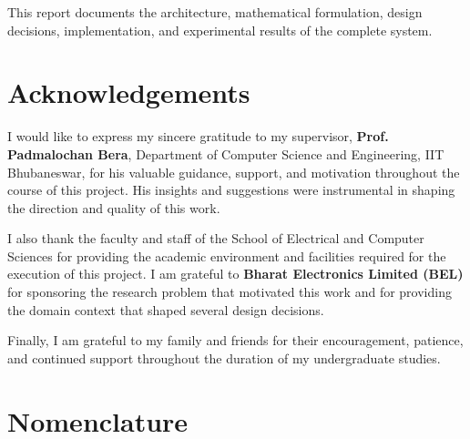 \documentclass[12pt, a4paper]{report}
\begin{document}
This report documents the architecture, mathematical formulation, design
decisions, implementation, and experimental results of the complete system.

\vfill

\chapter*{Acknowledgements}
\thispagestyle{plain}

I would like to express my sincere gratitude to my supervisor,
\textbf{Prof. Padmalochan Bera}, Department of Computer Science and Engineering,
IIT Bhubaneswar, for his valuable guidance, support, and motivation throughout
the course of this project. His insights and suggestions were instrumental in
shaping the direction and quality of this work.

I also thank the faculty and staff of the School of Electrical and Computer
Sciences for providing the academic environment and facilities required for
the execution of this project. I am grateful to \textbf{Bharat Electronics
Limited (BEL)} for sponsoring the research problem that motivated this work
and for providing the domain context that shaped several design decisions.

Finally, I am grateful to my family and friends for their encouragement,
patience, and continued support throughout the duration of my undergraduate
studies.

\vfill
\clearpage

\tableofcontents
\cleardoublepage

\listoffigures
{}
\cleardoublepage

\listoftables
{}
\cleardoublepage

\chapter*{Nomenclature}
\end{document}
